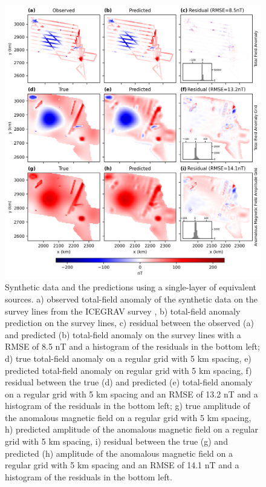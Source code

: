 \begin{figure}[tb!]
\centering
\includegraphics[width=1\linewidth]{figures/single_layer_synthetic.png}
\caption{
    Synthetic data and the predictions using a single-layer of equivalent sources. a) observed total-field anomaly of the synthetic data on the survey lines from the ICEGRAV survey \citep{ICEGRAV_data}, b) total-field anomaly prediction on the survey lines, c) residual between the observed (a) and predicted (b) total-field anomaly on the survey lines with a RMSE of 8.5 nT and a histogram of the residuals in the bottom left; d) true total-field anomaly on a regular grid with 5 km spacing, e) predicted total-field anomaly on regular grid with 5 km spacing, f) residual between the true (d) and predicted (e) total-field anomaly on a regular grid with 5 km spacing and an RMSE of 13.2 nT and a histogram of the residuals in the bottom left; g) true amplitude of the anomalous magnetic field on a regular grid with 5 km spacing, h) predicted amplitude of the anomalous magnetic field on a regular grid with 5 km spacing, i) residual between the true (g) and predicted (h) amplitude of the anomalous magnetic field on a regular grid with 5 km spacing and an RMSE of 14.1 nT and a histogram of the residuals in the bottom left.
}
\label{fig:single_layer_synthetic}
\end{figure}

